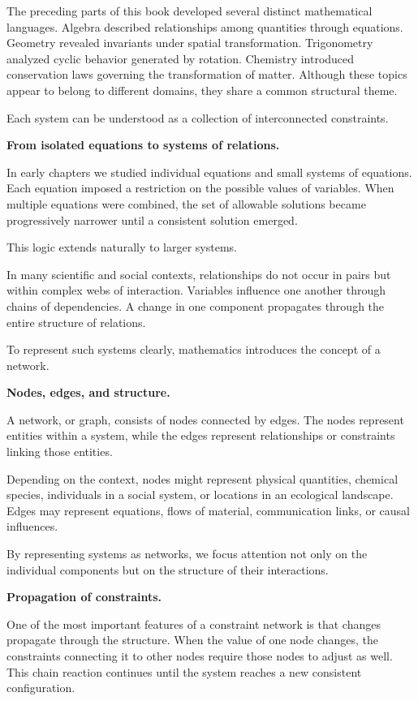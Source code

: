 \documentclass[11pt, openany]{book}
\theoremstyle{plain}
\theoremstyle{definition}
\theoremstyle{remark}
\begin{document}
The preceding parts of this book developed several distinct mathematical
languages. Algebra described relationships among quantities through
equations. Geometry revealed invariants under spatial transformation.
Trigonometry analyzed cyclic behavior generated by rotation. Chemistry
introduced conservation laws governing the transformation of matter.
Although these topics appear to belong to different domains, they share
a common structural theme.

Each system can be understood as a collection of interconnected
constraints.

\medskip

\textbf{From isolated equations to systems of relations.}

In early chapters we studied individual equations and small systems of
equations. Each equation imposed a restriction on the possible values of
variables. When multiple equations were combined, the set of allowable
solutions became progressively narrower until a consistent solution
emerged.

This logic extends naturally to larger systems.

In many scientific and social contexts, relationships do not occur in
pairs but within complex webs of interaction. Variables influence one
another through chains of dependencies. A change in one component
propagates through the entire structure of relations.

To represent such systems clearly, mathematics introduces the concept of
a network.

\medskip

\textbf{Nodes, edges, and structure.}

A network, or graph, consists of nodes connected by edges. The nodes
represent entities within a system, while the edges represent
relationships or constraints linking those entities.

Depending on the context, nodes might represent physical quantities,
chemical species, individuals in a social system, or locations in an
ecological landscape. Edges may represent equations, flows of material,
communication links, or causal influences.

By representing systems as networks, we focus attention not only on the
individual components but on the structure of their interactions.

\medskip

\textbf{Propagation of constraints.}

One of the most important features of a constraint network is that
changes propagate through the structure. When the value of one node
changes, the constraints connecting it to other nodes require those
nodes to adjust as well. This chain reaction continues until the system
reaches a new consistent configuration.
\end{document}
